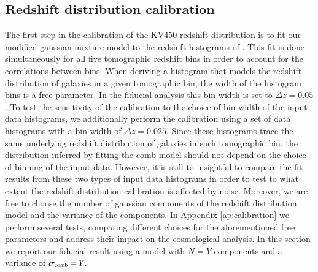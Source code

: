 \documentclass{aa}
\begin{document}
\subsection{Redshift distribution calibration}
\label{sec:redshift_calibration}
The first step in the calibration of the KV450 redshift distribution is to fit our modified gaussian mixture model to the redshift histograms of \cite{hildebrandt18}. This fit is done simultaneously for all five tomographic redshift bins in order to account for the correlations between bins. When deriving a histogram that models the redshift distribution of galaxies in a given tomographic bin, the width of the histogram bins is a free parameter. In the fiducial analysis this bin width is set to $\Delta z = 0.05$.  To test the sensitivity of the calibration to the choice of bin width of the input data histograms, we additionally perform the calibration using a set of data histograms with a bin width of $\Delta z = 0.025$.  Since these histograms trace the same underlying redshift distribution of galaxies in each tomographic bin, the distribution inferred by fitting the comb model should not depend on the choice of binning of the input data. However, it is still to insightful to compare the fit results from these two types of input data histograms in order to test to what extent the redshift distribution calibration is affected by noise. Moreover, we are free to choose the number of gaussian components of the redshift distribution model and the variance of the components. In Appendix \ref{ap:calibration} we perform several tests, comparing different choices for the aforementioned free parameters and address their impact on the cosmological analysis. In this section we report our fiducial result using a model with $N = Y$ components and a variance of $\sigma_{\rm comb} = Y$. 
\end{document}
